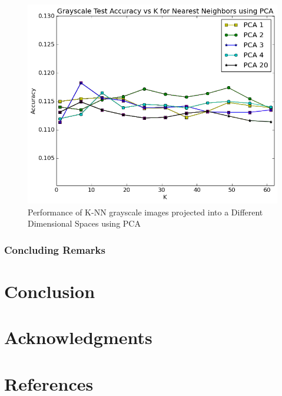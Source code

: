 \documentclass{article} %
\begin{document}
\begin{figure}
\centering
	\includegraphics[width=0.8\linewidth]{./plots/knn/grayscale}
    	\caption{Performance of K-NN grayscale images projected into a Different Dimensional Spaces using PCA}
	\label{fig:knn}
\end{figure}

\subsubsection{Concluding Remarks}


\section{Conclusion}



\section*{Acknowledgments}

\section*{References}

\small{
\nocite{*}


}
\end{document}
